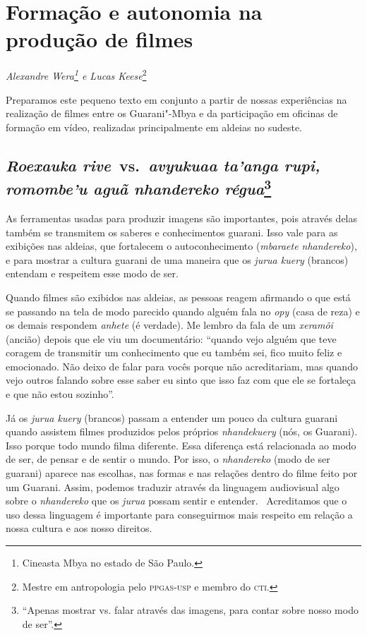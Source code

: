 \thispagestyle{empty}

\chapter*{Formação e autonomia na produção de filmes}


\begin{flushright}
\emph{Alexandre Wera\footnote{Cineasta Mbya no estado de São Paulo.} e Lucas
Keese}\footnote{Mestre em antropologia pelo \textsc{ppgas}-\textsc{usp} e membro do
\textsc{cti}.}
\end{flushright}
\medskip

\noindent Preparamos este pequeno texto em conjunto a partir de nossas
experiências na realização de filmes entre os Guarani"-Mbya e da
participação em oficinas de formação em vídeo, realizadas
principalmente em aldeias no sudeste.

\section{\emph{Roexauka rive}~vs.~\emph{avyukuaa ta’anga rupi, romombe’u aguã nhandereko régua}\footnotesize\protect\footnote{``\uppercase{A}penas mostrar vs. falar através das imagens, para contar sobre nosso modo de ser''.}}{}

As ferramentas usadas para produzir imagens são importantes, pois
através delas também se transmitem os saberes e conhecimentos guarani.
Isso vale para as exibições nas aldeias, que fortalecem o
autoconhecimento (\emph{mbaraete nhandereko}), e para mostrar a cultura
guarani de uma maneira que os \emph{jurua kuery} (brancos) entendam e
respeitem esse modo de ser.

Quando filmes são exibidos nas aldeias, as pessoas reagem afirmando o
que está se passando na tela de modo parecido quando alguém fala no \emph{opy}
(casa de reza) e os demais respondem \emph{anhete} (é verdade). Me lembro da
fala de um \emph{xeramõi} (ancião) depois que ele viu um documentário: ``quando
vejo alguém que teve coragem de transmitir um conhecimento que eu
também sei, fico muito feliz e emocionado. Não deixo de falar para
vocês porque não acreditariam, mas quando vejo outros falando sobre
esse saber eu sinto que isso faz com que ele se fortaleça e que não
estou sozinho''.

Já os \emph{jurua kuery} (brancos) passam a entender um pouco da cultura
guarani quando assistem filmes produzidos pelos próprios \emph{nhandekuery}
(nós, os Guarani). Isso porque todo mundo filma diferente. Essa
diferença está relacionada ao modo de ser, de pensar e de sentir o
mundo. Por isso, o \emph{nhandereko} (modo de ser guarani) aparece nas
escolhas, nas formas e nas relações dentro do filme feito por um
Guarani. Assim, podemos traduzir através da linguagem audiovisual algo
sobre o \emph{nhandereko} que os \emph{jurua} possam sentir e entender.~ Acreditamos
que o uso dessa linguagem é importante para conseguirmos mais respeito
em relação a nossa cultura e aos nosso direitos.

